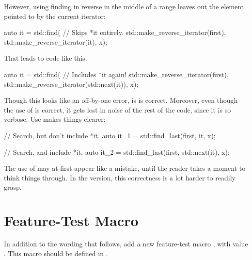 \documentclass[ebook,10pt,oneside,openany,final]{memoir}
\begin{document}
However, using finding in reverse in the middle of a range leaves out the
element pointed to by the current iterator:

\begin{itemdecl}
    auto it = std::find( // Skips *it entirely.
        std::make_reverse_iterator(first),
        std::make_reverse_iterator(it),
        x);
\end{itemdecl}

That leads to code like this:

\begin{itemdecl}
    auto it = std::find( // Includes *it again!
        std::make_reverse_iterator(first),
        std::make_reverse_iterator(std::next(it)),
        x);
\end{itemdecl}

Though this looks like an off-by-one error, is is correct.  Moreover, even
though the use of  is correct, it gets lost in noise of the rest
of the code, since it is so verbose.  Use  makes things
clearer:

\begin{itemdecl}
    // Search, but don't include *it.
    auto it_1 = std::find_last(first, it, x);

    // Search, and include *it.
    auto it_2 = std::find_last(first, std::next(it), x);
\end{itemdecl}

The use of  may at first appear like a mistake, until the reader
takes a moment to think things through.  In the 
version, this correctness is a lot harder to readily grasp.

\section{Feature-Test Macro}

In addition to the wording that follows, add a new feature-test macro
, with value .  This macro should be
defined in .

\newcommand{\indexhdr}[1]{}
\newcommand{\indexlibrarymember}[2]{
}




\end{document}
